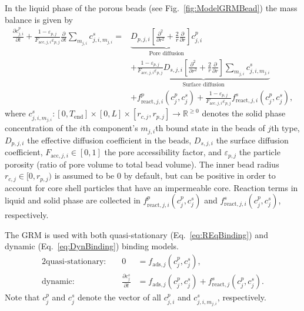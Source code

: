 In the liquid phase of the porous beads (see Fig.~\ref{fig:ModelGRMBead}) the mass balance is given by
\begin{equation} \begin{split}
	\frac{\partial c^p_{j,i}}{\partial t} + \frac{1 - \varepsilon_{p,j}}{F_{\text{acc},j,i} \varepsilon_{p,j}} \frac{\partial}{\partial t} \sum_{m_{j,i}} c^s_{j,i,m_{j,i}} = &\underbrace{D_{p,j,i} \left[\frac{\partial^2}{\partial r^2} + \frac{2}{r} \frac{\partial}{\partial r} \right]c^p_{j,i}}_{\text{Pore diffusion}} \\
	&+ \underbrace{\frac{1 - \varepsilon_{p,j}}{F_{\text{acc},j,i} \varepsilon_{p,j}} D_{s,j,i} \left[\frac{\partial^2}{\partial r^2} + \frac{2}{r} \frac{\partial }{\partial r} \right] \sum_{m_{j,i}} c^s_{j,i,m_{j,i}} }_{\text{Surface diffusion}} \\
	&+ f_{\text{react},j,i}^p\left( c_j^p, c_j^s \right) + \frac{1 - \varepsilon_{p,j}}{F_{\text{acc},j,i} \varepsilon_{p,j}} f_{\text{react},j,i}^s\left( c_j^p, c_j^s \right), \label{eq:ModelBead}
\end{split}\end{equation}
where $c^s_{j,i,m_{j,i}}\colon \left[0, T_{\text{end}}\right] \times [0,L] \times [r_{c,j}, r_{p,j}] \rightarrow \mathds{R}^{\geq 0}$ denotes the solid phase concentration of the $i$th component's $m_{j,i}$th bound state in the beads of $j$th type, $D_{p,j,i}$ the effective diffusion coefficient in the beads, $D_{s,j,i}$ the surface diffusion coefficient, $F_{\text{acc},j,i} \in [0,1]$ the pore accessibility factor, and $\varepsilon_{p,j}$ the particle porosity (ratio of pore volume to total bead volume).
The inner bead radius $r_{c,j} \in [0, r_{p,j})$ is assumed to be $0$ by default, but can be positive in order to account for core shell particles that have an impermeable core.
Reaction terms in liquid and solid phase are collected in $f_{\text{react},j,i}^p( c_j^p, c_j^s)$ and $f_{\text{react},j,i}^s(c_j^p, c_j^s)$, respectively.

The GRM is used with both quasi-stationary (Eq.~\eqref{eq:REqBinding}) and dynamic (Eq.~\eqref{eq:DynBinding}) binding models. 
\begin{alignat}{2}
	\text{quasi-stationary: }& & 0 &= f_{\text{ads},j}\left( c^p_j, c^s_j\right), \label{eq:REqBinding} \\
	\text{dynamic: }& & \frac{\partial c^s_j}{\partial t} &= f_{\text{ads},j}\left( c^p_j, c^s_j\right) + f_{\text{react},j}^s\left( c_j^p, c_j^s \right). \label{eq:DynBinding}
\end{alignat}
Note that $c^p_j$ and $c^s_j$ denote the vector of all $c^p_{j,i}$ and $c^s_{j,i,m_{j,i}}$, respectively.

